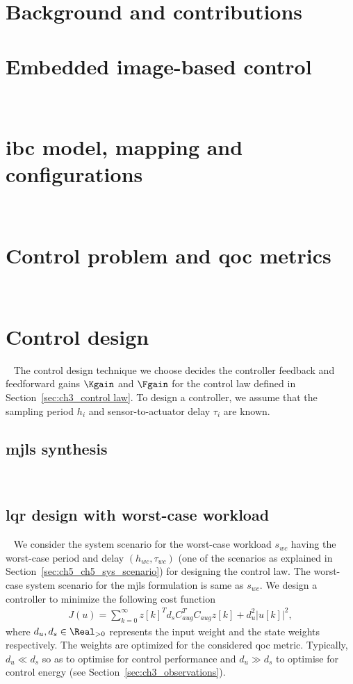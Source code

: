 


\section{Background and contributions}


\section{Embedded image-based control}~\label{sec:ch3_ProblemSetting}

\section{\texorpdfstring{\Gls{ibc}}{IBC} model, mapping and configurations}~\label{sec:ch3_sys_model}

\section{Control problem and \texorpdfstring{\gls{qoc}}{QoC} metrics}~\label{sec:ch3_control_problem}

\section{Control design}~\label{sec:ch3_control_design}
The control design technique we choose decides the controller feedback and feedforward gains $\Kgain$ and $\Fgain$ for the control law defined in Section~\ref{sec:ch3_control law}. To design a controller, we assume that the sampling period $h_i$ and sensor-to-actuator delay $\tau_i$ are known.
\subsection{\Gls{mjls} synthesis}~\label{sec:ch3_MJLS}

\subsection{\Gls{lqr} design with worst-case workload}~\label{sec:ch3_LQR}
We consider the system scenario for the worst-case workload $s_{wc}$ having the worst-case period and delay $(h_{wc},\tau_{wc})$ (one of the scenarios as explained in Section~\ref{sec:ch5_ch5_sys_scenario}) for designing the control law. The worst-case system scenario for the \gls{mjls} formulation is same as $s_{wc}$. We design a controller to minimize the following cost function
\begin{align}
J(u) = \sum\limits_{k=0}^{\infty} z[k]^Td_sC_{aug}^TC_{aug}z[k] + d_u^2|u[k]|^2,\nonumber
\end{align}
where $d_u,d_s \in \Real_{>0}$ represents the input weight and the state weights respectively. The weights are optimized for the considered \gls{qoc} metric. Typically, $d_u\ll d_s$ so as to optimise for control performance and $d_u\gg d_s$ to optimise for control energy (see Section~\ref{sec:ch3_observations}).
